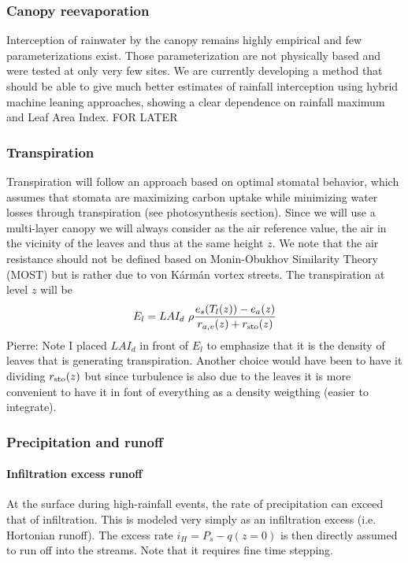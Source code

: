 \documentclass[twoside,10pt]{report}
\begin{document}
\subsubsection{Canopy reevaporation}
Interception of rainwater by the canopy remains highly empirical and few parameterizations exist. Those parameterization are not physically based and were tested at only very few sites. We are currently developing a method that should be able to give much better estimates of rainfall interception using hybrid machine leaning approaches, showing a clear dependence on rainfall maximum and Leaf Area Index. FOR LATER

\subsubsection{Transpiration}
Transpiration will follow an approach based on optimal stomatal behavior, which assumes that stomata are maximizing carbon uptake while minimizing water losses through transpiration (see photosynthesis section). 
Since we will use a multi-layer canopy we will always consider as the air reference value, the air in the vicinity of the leaves and thus at the same height $z$. We note that the air resistance should not be defined based on Monin-Obukhov Similarity Theory (MOST) but is rather due to von Kármán vortex streets.
The transpiration at level $z$ will be
\begin{equation}
    E_l = LAI_d \ \rho \frac{e_s(T_l(z))-e_{a}(z)}{r_{a,v}(z)+r_{\rm sto}(z)}
\end{equation}
Pierre: Note I placed $LAI_d$ in front of $E_l$ to emphasize that it is the density of leaves that is generating transpiration. Another choice would have been to have it dividing $r_{\rm sto}(z)$ but since turbulence is also due to the leaves it is more convenient to have it in font of everything as a density weigthing (easier to integrate).

\subsubsection{Precipitation and runoff }
\paragraph{Infiltration excess runoff}
At the surface during high-rainfall events, the rate of precipitation can exceed that of infiltration. This is modeled very simply as an infiltration excess (i.e. Hortonian runoff). The excess rate $i_H = P_s-q(z=0)$ is then directly assumed to run off into the streams. Note that it requires fine time stepping.
\end{document}
